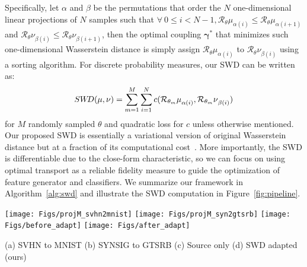 \documentclass[10pt,twocolumn,letterpaper]{article}
\newcommand{\Gzero}{{\boldsymbol{\gamma}}^*}
\begin{document}
Specifically, let $\alpha$ and $\beta$ be the permutations that order the $N$ one-dimensional linear projections of $N$ samples such that $\forall \: 0 \leq i < N-1, {{\mathcal{R}_\theta} \mu}_{\alpha(i)} \leq {{\mathcal{R}_\theta} \mu}_{\alpha(i+1)}$ and ${{\mathcal{R}_\theta} \nu}_{\beta(i)} \leq {{\mathcal{R}_\theta} \nu}_{\beta(i+1)}$, then the optimal coupling $\Gzero$ that minimizes such one-dimensional Wasserstein distance is simply assign ${{\mathcal{R}_\theta} \mu}_{\alpha(i)}$ to ${{\mathcal{R}_\theta} \nu}_{\beta(i)}$ using a sorting algorithm.
For discrete probability measures, our SWD can be written as:
 \begin{equation}
 \small
SW\hspace{-0.7mm}D (\mu, \nu) = \sum\limits_{m=1}^{M} \sum\limits_{i=1}^{N}  c({{\mathcal{R}_{\theta_m}} \mu}_{\alpha(i)}, {{\mathcal{R}_{\theta_m}} \nu}_{\beta(i)})
 \end{equation}
 for $M$ randomly sampled $\theta$ and quadratic loss for $c$ unless otherwise mentioned.
Our proposed SWD is essentially a variational version of original Wasserstein distance but at a fraction of its computational cost~\cite{bonneel2015sliced}. More importantly, the SWD is differentiable due to the close-form characteristic, so we can focus on using optimal transport as a reliable fidelity measure to guide the optimization of feature generator and classifiers. 
We summarize our framework in Algorithm~\ref{alg:swd} and illustrate the SWD computation in Figure~\ref{fig:pipeline}.

\begin{figure*}
\begin{center}
\texttt{[image: Figs/projM\_svhn2mnist]}
\texttt{[image: Figs/projM\_syn2gtsrb]}
\texttt{[image: Figs/before\_adapt]}
\texttt{[image: Figs/after\_adapt]}
\end{center}
\vspace{-3mm}
\small \hspace{10mm} (a) SVHN to MNIST  \hspace{17mm} (b) SYNSIG to GTSRB \hspace{17mm} (c) Source only \hspace{13.5mm} (d) SWD adapted (ours)
\vspace{-2mm}
   \caption{The effect of number of radial projections $M$ to accuracy on (a) SVHN to MNIST adaptation, and (b) SYNSIG to GTSRB adaptation. $M=128$ is sufficient for stable optimization and good accuracies. T-SNE~\cite{maaten2008visualizing} visualization of features obtained from SVHN to MNIST experiment by (c) source domain only, and (d) SWD adaptation. Blue and red points denote the source and target samples, respectively. Our method generates much more discriminative feature representation compared to source only setting.}
\label{fig:projection}
\vspace{-2mm}
\end{figure*}
\end{document}
